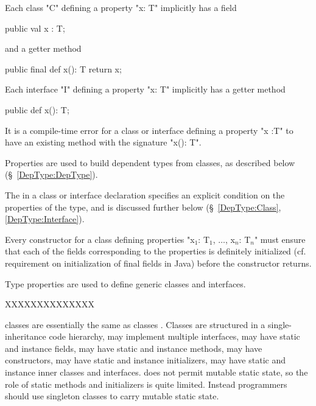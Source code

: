 Each class \xcd"C" defining a property \xcd"x: T" implicitly has a field

\begin{xten}
public val x : T;
\end{xten} 

\noindent and a getter method

\begin{xten}
public final def x(): T { return x; }
\end{xten}

\noindent Each interface \xcd"I" defining a property \xcd"x: T"
implicitly has a getter method

\begin{xten}
public def x(): T;
\end{xten}

\begin{staticrule*}
It is a compile-time error for a class or
interface defining a property \xcd"x :T" to have an existing method with
the signature \xcd"x(): T".
\end{staticrule*}


Properties are used to build dependent types from classes, as
described below (\S~\ref{DepType:DepType}).

The  in a class or interface declaration specifies an
explicit condition on the properties of the type, and is discussed further
below (\S~\ref{DepType:Class}, \ref{DepType:Interface}).

\begin{staticrule*}
     Every constructor for a class defining
   properties \xcdmath"x$_1$: T$_1$, $\ldots$, x$_n$: T$_n$" must ensure that each of the fields
   corresponding to the properties is definitely initialized
   (cf. requirement on initialization of final fields in Java) before the
   constructor returns.
\end{staticrule*}

Type properties are used to define generic classes and
interfaces.

XXXXXXXXXXXXXX


{}\Xten{} classes are essentially the same as \java{} classes \cite[\S 8]{jls2}. Classes are structured in a single-inheritance code
hierarchy, may implement multiple interfaces, may have static and
instance fields, may have static and instance methods, may have
constructors, may have static and instance initializers, may have
static and instance inner classes and interfaces. \Xten{} does not
permit mutable static state, so the role of static methods and
initializers is quite limited. Instead programmers should use
singleton classes to carry mutable static state.

